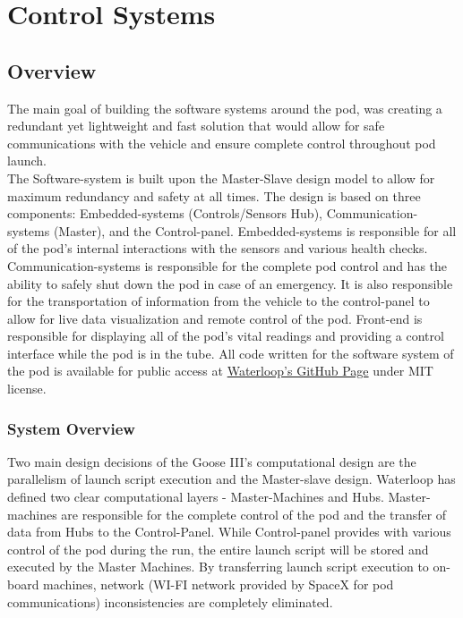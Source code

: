 \section{Control Systems}
\subsection{Overview}
\newcommand{\itc}{I$^2$C}
The main goal of building the software systems around the pod, was creating a redundant yet lightweight and fast solution that would allow for safe communications with the vehicle and ensure complete control throughout pod launch.\\

The Software-system is built upon the Master-Slave design model to allow for maximum redundancy and safety at all times. The design is based on three components: Embedded-systems (Controls/Sensors Hub), Communication-systems (Master), and the Control-panel. 
Embedded-systems is responsible for all of the pod's internal interactions with the sensors and various health checks. 
Communication-systems is responsible for the complete pod control and has the ability to safely shut down the pod in case of an emergency. It is also responsible for the transportation of information from the vehicle to the control-panel to allow for live data visualization and remote control of the pod. 
Front-end is responsible for displaying all of the pod's vital readings and providing a control interface while the pod is in the tube. All code written for the software system of the pod is available for public access at \href{https://github.com/teamwaterloop}{Waterloop's GitHub Page} under MIT license.

\subsubsection{System Overview}
Two main design decisions of the Goose III's computational design are the parallelism of launch script execution and the Master-slave design. Waterloop has defined two clear computational layers - Master-Machines and Hubs. Master-machines are responsible for the complete control of the pod and the transfer of data from Hubs to the Control-Panel. While Control-panel provides with various control of the pod during the run, the entire launch script will be stored and executed by the Master Machines. By transferring launch script execution to on-board machines, network (WI-FI network provided by SpaceX for pod communications) inconsistencies are completely eliminated.

